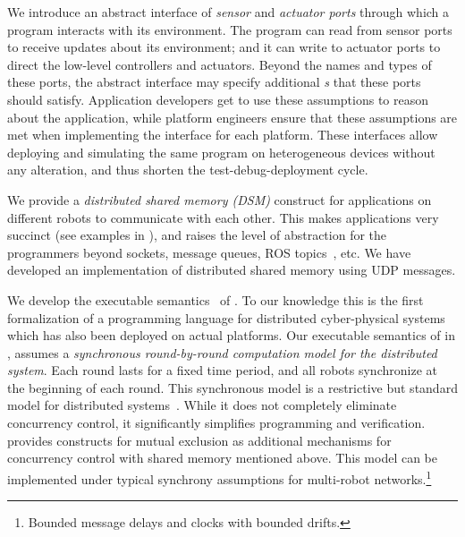 \begin{noinditem}
\item We introduce an abstract interface of \emph{sensor} and \emph{actuator ports} through which a \lgname program interacts with its environment.
The program can read from sensor ports to receive updates about its environment;
and it can write to actuator ports to direct the low-level controllers and actuators.
Beyond the names and types of these ports, the abstract interface may specify additional \emph{\portasum{}s} that these ports should satisfy.
Application developers get to use these assumptions to reason about the \lgname application,
while platform engineers ensure that these assumptions are met when implementing the interface for each platform.
These interfaces allow deploying and simulating the same \lgname program on heterogeneous devices without any alteration,
and thus shorten the test-debug-deployment cycle.

\item We provide a \emph{distributed shared memory (DSM)} construct for \lgname applications on different robots to communicate with each other.
This makes \lgname applications very succinct (see examples in ),
and raises the level of abstraction for the programmers beyond sockets, message queues, ROS topics~\cite{ros}, etc.
We have developed an implementation of distributed shared memory using UDP messages. %

\item We develop the executable \K semantics~\cite{rosu-serbanuta-2013-k} of \lgname.
To our knowledge this is the first formalization of a programming language for distributed cyber-physical systems which has also been deployed on actual platforms.
Our executable semantics of \lgname in \K, assumes a \emph{synchronous round-by-round computation model for the distributed system}.
Each round lasts for a fixed time period, and all robots synchronize at the beginning of each round.
This synchronous model is a restrictive but standard model for distributed systems~\cite{lynch1996a,attiyawelch}.
While it does not completely eliminate concurrency control, it significantly simplifies programming and verification.
\lgname provides constructs for mutual exclusion as additional mechanisms for concurrency control with shared memory mentioned above.
This model can be implemented under typical synchrony assumptions for multi-robot networks.\footnote{Bounded message delays and clocks with bounded drifts.}


\end{noinditem}
